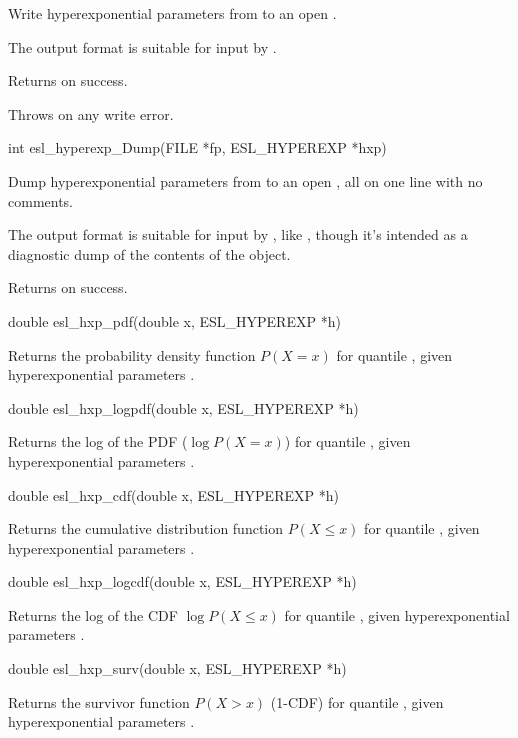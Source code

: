 \begin{sreapi}
Write hyperexponential parameters from  to an open .

The output format is suitable for input by .

Returns  on success.

Throws  on any write error.


\hypertarget{func:esl_hyperexp_Dump()}
{\item[int esl\_hyperexp\_Dump(FILE *fp, ESL\_HYPEREXP *hxp)]}

Dump hyperexponential parameters from  to an open ,
all on one line with no comments.

The output format is suitable for input by
, like ,
though it's intended as a diagnostic dump of the
contents of the object.

Returns  on success.


\hypertarget{func:esl_hxp_pdf()}
{\item[double esl\_hxp\_pdf(double x, ESL\_HYPEREXP *h)]}

Returns the probability density function $P(X=x)$ for
quantile , given hyperexponential parameters .


\hypertarget{func:esl_hxp_logpdf()}
{\item[double esl\_hxp\_logpdf(double x, ESL\_HYPEREXP *h)]}

Returns the log of the PDF ($\log P(X=x)$) for quantile ,
given hyperexponential parameters .


\hypertarget{func:esl_hxp_cdf()}
{\item[double esl\_hxp\_cdf(double x, ESL\_HYPEREXP *h)]}

Returns the cumulative distribution function $P(X \leq x)$
for quantile , given hyperexponential parameters .


\hypertarget{func:esl_hxp_logcdf()}
{\item[double esl\_hxp\_logcdf(double x, ESL\_HYPEREXP *h)]}

Returns the log of the CDF $\log P(X \leq x)$
for quantile , given hyperexponential parameters .


\hypertarget{func:esl_hxp_surv()}
{\item[double esl\_hxp\_surv(double x, ESL\_HYPEREXP *h)]}

Returns the survivor function $P(X > x)$ (1-CDF)
for quantile , given hyperexponential parameters .



\end{sreapi}
